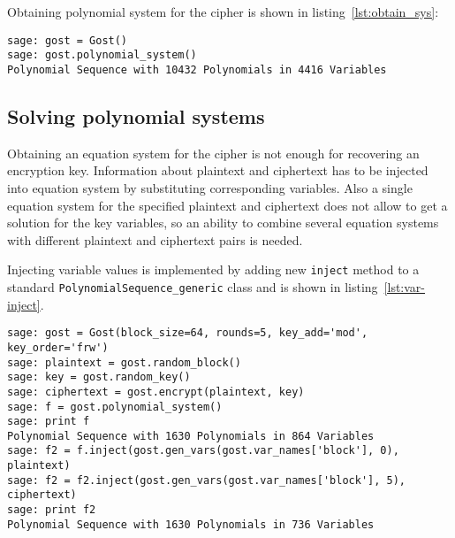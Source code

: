 Obtaining polynomial system for the cipher is shown in
listing~\ref{lst:obtain_sys}:
\begin{lstlisting}[label=lst:obtain_sys, caption=Obtaining polynomial system]
sage: gost = Gost()
sage: gost.polynomial_system()
Polynomial Sequence with 10432 Polynomials in 4416 Variables
\end{lstlisting}

\subsection{Solving polynomial systems}
\label{sec:soft-solving}

Obtaining an equation system for the cipher is not enough for recovering an
encryption key. Information about plaintext and ciphertext has to be injected
into equation system by substituting corresponding variables. Also a single
equation system for the specified plaintext and ciphertext does not allow to get a
solution for the key variables, so an ability to combine several equation
systems with different plaintext and ciphertext pairs is needed.

Injecting variable values is implemented by adding new \verb+inject+ method to
a standard \verb+PolynomialSequence_generic+ class and is shown in
listing~\ref{lst:var-inject}.

\begin{lstlisting}[label=lst:var-inject, caption=Injecting variable values into equation system]
sage: gost = Gost(block_size=64, rounds=5, key_add='mod', key_order='frw')             
sage: plaintext = gost.random_block()                                                  
sage: key = gost.random_key()                                                          
sage: ciphertext = gost.encrypt(plaintext, key)                                        
sage: f = gost.polynomial_system()                                                     
sage: print f                                                                        
Polynomial Sequence with 1630 Polynomials in 864 Variables
sage: f2 = f.inject(gost.gen_vars(gost.var_names['block'], 0), plaintext)   
sage: f2 = f2.inject(gost.gen_vars(gost.var_names['block'], 5), ciphertext)
sage: print f2
Polynomial Sequence with 1630 Polynomials in 736 Variables
\end{lstlisting}

